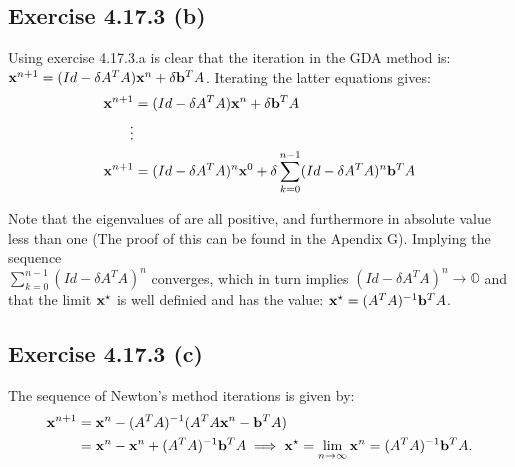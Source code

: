\documentclass{exam}
\begin{document}
\subsection*{Exercise 4.17.3 (b)}
Using exercise 4.17.3.a is clear that the iteration in the GDA method is: $\bold{x}^{n+1} = (Id - \delta A^{T}A)\bold{x}^{n} + \delta \bold{b}^{T}A$. Iterating the latter 
equations gives: \\
\begin{equation*}
    \begin{aligned}
        \bold{x}^{n+1} &= \displaystyle (Id - \delta A^{T}A)\bold{x}^{n} + \delta \bold{b}^{T}A \\
        \vdots&\\
        \bold{x}^{n+1} &= \displaystyle (Id - \delta A^{T}A)^{n}\bold{x}^{0} + \delta \sum_{k=0}^{n-1}(Id - \delta A^{T}A)^{n}\bold{b}^{T}A
    \end{aligned}    
\end{equation*}

\noindent Note that the eigenvalues of are all positive, and furthermore in absolute value less than one (The proof of this can be found in the Apendix G). Implying the sequence \\
$\displaystyle\sum_{k=0}^{n-1}(Id - \delta A^{T}A)^{n}$ converges, which in turn implies 
$\displaystyle(Id -\delta A^{T}A)^{n} \to \mathbb{O}$  and that the limit $\bold{x}^{\star}$ is well definied and has the value: $\bold{x}^{\star} = (A^{T}A)^{-1}\bold{b}^{T}A$.

\subsection*{Exercise 4.17.3 (c)}
The sequence of Newton's method iterations is given by:\\
\begin{equation*}
    \begin{aligned}
        \bold{x}^{n+1} &= \bold{x}^{n} - (A^{T}A)^{-1}(A^{T}A\bold{x}^{n} - \bold{b}^{T}A)\\
        &= \bold{x}^{n} - \bold{x}^{n} + (A^{T}A)^{-1}\bold{b}^{T}A \implies \bold{x}^{\star} = \displaystyle \lim_{n \to \infty}\bold{x}^{n} = (A^{T}A)^{-1}\bold{b}^{T}A .
    \end{aligned} 
\end{equation*}
\end{document}
